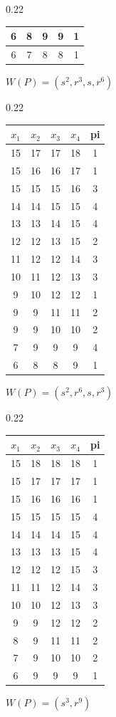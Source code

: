 \documentclass[10pt]{article}
\theoremstyle{definition}
\begin{document}
\begin{table}[h]
\begin{subtable}{0.22\textwidth}
\begin{tabular*}{\linewidth}{@{\extracolsep{\fill}}ccccc}
6 &8 &9 &9  &1\\
\hline
6 &7 &8 &8 &1 \\  
\bottomrule
\end{tabular*}
\center \scriptsize {$W(P)=(s^2, r^3, s, r^6)$} \label{tab:sub2}
\end{subtable}%
\hfill
\begin{subtable}{0.22\textwidth}
\begin{tabular*}{\linewidth}{@{\extracolsep{\fill}}ccccc}
\toprule
$x_1$ & $x_2$ & $x_3$ & $x_4$  &  pi \\
\midrule
15& 17& 17& 18&1 \\
15& 16 &16 &17&1 \\
15& 15& 15& 16 & 3 \\
\hline
14& 14& 15 &15& 4 \\
13& 13& 14 &15&  4 \\
12& 12& 13& 15 & 2 \\
\hline
11 &12& 12& 14&3  \\
10& 11& 12& 13 &3\\
9 & 10& 12& 12& 1\\
\hline
9 &9& 11 &11& 2 \\
9 &9 &10& 10 &2\\
7 &9& 9& 9 & 4\\
\hline
6& 8 &8& 9& 1\\
\bottomrule
\end{tabular*}
\center \scriptsize {$W(P) =(s^2, r^6, s, r^3)$} \label{tab:sub3}
\end{subtable}
\hfill
\begin{subtable}{0.22\textwidth}
\begin{tabular*}{\linewidth}{@{\extracolsep{\fill}}ccccc} 
\toprule
$x_1$ & $x_2$ & $x_3$ & $x_4$  &  pi \\
\midrule
15 &  18 &  18  & 18  &  1  \\
15 & 17  & 17 & 17 &  1  \\
15 &  16 &  16  & 16  &  1  \\
\hline
15 &  15  & 15 &  15  &   4  \\
14  & 14  & 14  & 15 &   4  \\
13  & 13  & 13 & 15  &   4  \\
\hline
12  & 12 &  12 &  15 &  3   \\
11  & 11 &  12  & 14 &  3 \\
10 &  10  & 12 &  13   &  3 \\
\hline
9  & 9 &  12 &  12  &   2 \\ 
8  & 9 &  11 &  11  &   2 \\
7  & 9  & 10 &  10  &  2 \\
\hline
6  & 9  & 9 &  9 & 1  \\ 
\bottomrule
\end{tabular*}
\center \scriptsize {$W(P) =(s^3, r^9)$} \label{tab:sub4}
\end{subtable}%
\hfill
\end{table}
\end{document}
